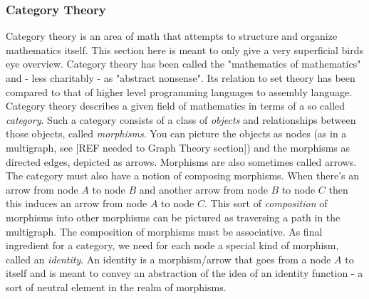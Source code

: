 




\subsubsection{Category Theory}
Category theory is an area of math that attempts to structure and organize mathematics itself. This section here is meant to only give a very superficial birds eye overview. Category theory has been called the "mathematics of mathematics" and - less charitably - as "abstract nonsense". Its relation to set theory has been compared to that of higher level programming languages to assembly language. Category theory describes a given field of mathematics in terms of a so called \emph{category}. Such a category consists of a class of \emph{objects} and relationships between those objects, called \emph{morphisms}. You can picture the objects as nodes (as in a multigraph, see [REF needed to Graph Theory section]) and the morphisms as directed edges, depicted as arrows. Morphisms are also sometimes called arrows. The category must also have a notion of composing morphisms. When there's an arrow from node $A$ to node $B$ and another arrow from node $B$ to node $C$ then this induces an arrow from node $A$ to node $C$. This sort of \emph{composition} of morphisms into other morphisms can be pictured as traversing a path in the multigraph. The composition of morphisms must be associative. As final ingredient for a category, we need for each node a special kind of morphism, called an \emph{identity}. An identity is a morphism/arrow that goes from a node $A$ to itself and is meant to convey an abstraction of the idea of an identity function - a sort of neutral element in the realm of morphisms.


